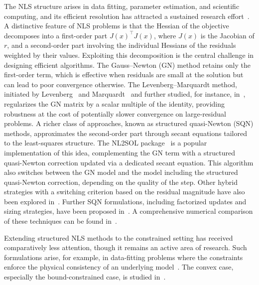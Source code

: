 \documentclass[pdflatex,sn-mathphys-num]{sn-jnl}%
\theoremstyle{thmstyleone}%
\begin{document}
The NLS structure arises in data fitting, parameter estimation, and scientific computing, and its efficient resolution has attracted a sustained research effort~\cite{dennisschnabel:1996,nocedalwright:2006,bjork:2024}. 
A distinctive feature of NLS problems is that the Hessian of the objective decomposes into a first-order part $J(x)^\top J(x)$, where $J(x)$ is the Jacobian of $r$, and a second-order part involving the individual Hessians of the residuals weighted by their values. Exploiting this decomposition is the central challenge in designing
efficient algorithms.
The Gauss--Newton (GN) method retains only the first-order term, which is effective when residuals are small at the solution but can lead to poor convergence otherwise.
The Levenberg--Marquardt method, initiated by Levenberg~\cite{levenberg:1944} and Marquardt~\cite{marquardt:1963} and further studied, for instance, in~\cite{bellavia-etal:2018, bergou-etal:2021}, regularizes the GN matrix by a scalar multiple of the identity, providing robustness at the cost of potentially slower convergence on large-residual problems.
A richer class of approaches, known as structured quasi-Newton (SQN) methods, approximates the second-order part through secant equations tailored to the least-squares structure. The NL2SOL package~\cite{dennisetal:1981,dennis-etal:1989} is a popular implementation of this idea, complementing the GN term with a structured quasi-Newton correction updated via a dedicated secant equation. This algorithm also switches between the GN model and the model including the structured quasi-Newton correction, depending on the quality of the step. Other hybrid strategies with a switching criterion based on the residual magnitude have also been explored in~\cite{albaalifletcher:1985, fletcherxu:1987, zhouchen:2010}. Further SQN formulations, including factorized updates and sizing strategies, have been proposed in~\cite{biggs:1977, betts:1976, huschens1994, yabetakahashi:1991, zhang-etal:2000}. A comprehensive numerical comparison of these techniques can be found in~\cite{lucksan-etal:2019}.

Extending structured NLS methods to the constrained setting has received comparatively less attention, though it remains an active area of research. Such formulations arise, for example, in data-fitting problems where the constraints enforce the physical consistency of an underlying model~\cite{grenieretal:2006, delbos-etal2006, pu-etal:2015}. The convex case, especially the bound-constrained case, is studied in~\cite{bellavia-etal:2004, bellavia-etal:2011, porcelli:2013, goncalvesmenezes:2020}.
\end{document}

